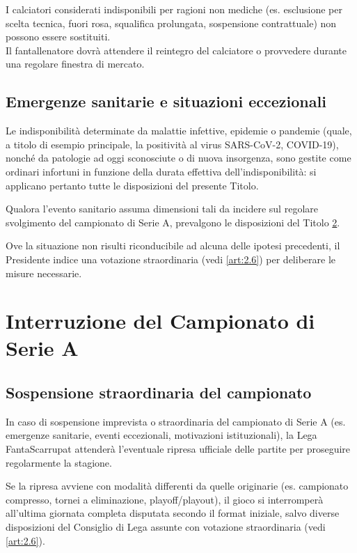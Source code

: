 I calciatori considerati indisponibili per ragioni non mediche (es. esclusione per scelta tecnica, fuori rosa, squalifica prolungata, sospensione contrattuale) non possono essere sostituiti.\\
Il fantallenatore dovrà attendere il reintegro del calciatore o provvedere durante una regolare finestra di mercato.

\section{Emergenze sanitarie e situazioni eccezionali}
\label{art:7.5}

Le indisponibilità determinate da malattie infettive, epidemie o pandemie (quale, a titolo di esempio principale, la positività al virus SARS-CoV-2, COVID-19), nonché da patologie ad oggi sconosciute o di nuova insorgenza, sono gestite come ordinari infortuni in funzione della durata effettiva dell'indisponibilità: si applicano pertanto tutte le disposizioni del presente Titolo.

Qualora l'evento sanitario assuma dimensioni tali da incidere sul regolare svolgimento del campionato di Serie A, prevalgono le disposizioni del Titolo \ref{cap:interruzione-campionato}.

Ove la situazione non risulti riconducibile ad alcuna delle ipotesi precedenti, il Presidente indice una votazione straordinaria (vedi \ref{art:2.6}) per deliberare le misure necessarie.


\chapter{Interruzione del Campionato di Serie A}
\label{cap:interruzione-campionato}

\section{Sospensione straordinaria del campionato}
\label{art:8.1}

In caso di sospensione imprevista o straordinaria del campionato di Serie A (es. emergenze sanitarie, eventi eccezionali, motivazioni istituzionali), la Lega FantaScarrupat attenderà l'eventuale ripresa ufficiale delle partite per proseguire regolarmente la stagione.

Se la ripresa avviene con modalità differenti da quelle originarie (es. campionato compresso, tornei a eliminazione, playoff/playout), il gioco si interromperà all'ultima giornata completa disputata secondo il format iniziale, salvo diverse disposizioni del Consiglio di Lega assunte con votazione straordinaria (vedi \ref{art:2.6}).

